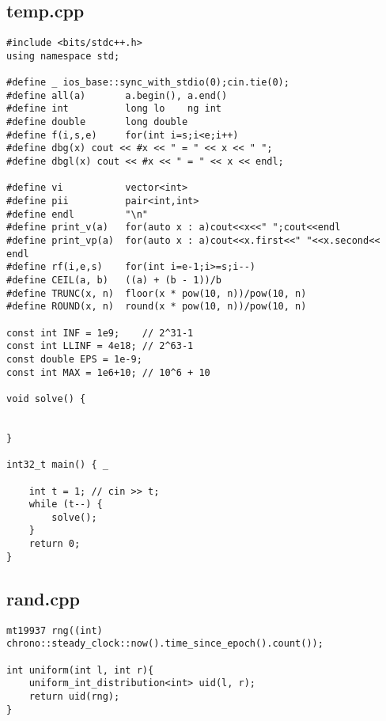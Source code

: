 \documentclass[11pt, a4paper, twoside]{article}
\begin{document}
\subsection{temp.cpp}
\begin{lstlisting}
#include <bits/stdc++.h>
using namespace std;

#define _ ios_base::sync_with_stdio(0);cin.tie(0);
#define all(a)       a.begin(), a.end()
#define int          long lo	ng int
#define double       long double
#define f(i,s,e) 	 for(int i=s;i<e;i++)
#define dbg(x) cout << #x << " = " << x << " ";
#define dbgl(x) cout << #x << " = " << x << endl;

#define vi 			 vector<int>
#define pii	         pair<int,int>
#define endl         "\n"
#define print_v(a)   for(auto x : a)cout<<x<<" ";cout<<endl
#define print_vp(a)  for(auto x : a)cout<<x.first<<" "<<x.second<< endl
#define rf(i,e,s) 	 for(int i=e-1;i>=s;i--)
#define CEIL(a, b)   ((a) + (b - 1))/b
#define TRUNC(x, n)  floor(x * pow(10, n))/pow(10, n)
#define ROUND(x, n)  round(x * pow(10, n))/pow(10, n)

const int INF = 1e9;    // 2^31-1
const int LLINF = 4e18; // 2^63-1
const double EPS = 1e-9;
const int MAX = 1e6+10; // 10^6 + 10

void solve() {

	
}

int32_t main() { _
	
	int t = 1; // cin >> t;
	while (t--) {
		solve();
	}
	return 0;
}
\end{lstlisting}

\subsection{rand.cpp}
\begin{lstlisting}
mt19937 rng((int) chrono::steady_clock::now().time_since_epoch().count());

int uniform(int l, int r){
	uniform_int_distribution<int> uid(l, r);
	return uid(rng);
}
\end{lstlisting}
\end{document}
